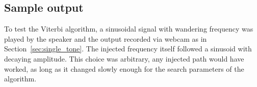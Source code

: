 \documentclass[paper-main.tex]{subfiles}
\begin{document}

\subsection{Sample output}
\label{sec:wanderingResults}

To test the Viterbi algorithm, a sinusoidal signal with wandering frequency was played by the speaker and the output recorded via webcam as in Section~\ref{sec:single_tone}. The injected frequency itself followed a sinusoid with decaying amplitude. This choice was arbitrary, any injected path would have worked, as long as it changed slowly enough for the search parameters of the algorithm.
\end{document}
